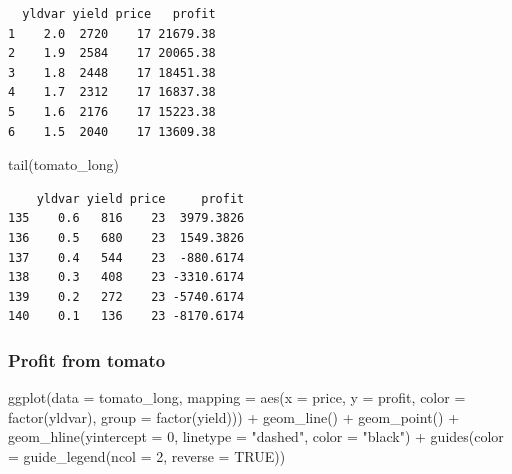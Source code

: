 \documentclass[
  letterpaper,
  DIV=11,
  numbers=noendperiod]{scrartcl}
\newenvironment{Shaded}{\begin{snugshade}}{\end{snugshade}}
\newcommand{\AttributeTok}[1]{\textcolor[rgb]{0.40,0.45,0.13}{#1}}
\newcommand{\ConstantTok}[1]{\textcolor[rgb]{0.56,0.35,0.01}{#1}}
\newcommand{\DecValTok}[1]{\textcolor[rgb]{0.68,0.00,0.00}{#1}}
\newcommand{\FunctionTok}[1]{\textcolor[rgb]{0.28,0.35,0.67}{#1}}
\newcommand{\NormalTok}[1]{\textcolor[rgb]{0.00,0.23,0.31}{#1}}
\newcommand{\SpecialCharTok}[1]{\textcolor[rgb]{0.37,0.37,0.37}{#1}}
\newcommand{\StringTok}[1]{\textcolor[rgb]{0.13,0.47,0.30}{#1}}
\begin{document}
\begin{verbatim}
  yldvar yield price   profit
1    2.0  2720    17 21679.38
2    1.9  2584    17 20065.38
3    1.8  2448    17 18451.38
4    1.7  2312    17 16837.38
5    1.6  2176    17 15223.38
6    1.5  2040    17 13609.38
\end{verbatim}

\begin{Shaded}
\begin{Highlighting}[]
\FunctionTok{tail}\NormalTok{(tomato\_long)}
\end{Highlighting}
\end{Shaded}

\begin{verbatim}
    yldvar yield price     profit
135    0.6   816    23  3979.3826
136    0.5   680    23  1549.3826
137    0.4   544    23  -880.6174
138    0.3   408    23 -3310.6174
139    0.2   272    23 -5740.6174
140    0.1   136    23 -8170.6174
\end{verbatim}

\subsubsection{Profit from tomato}\label{profit-from-tomato}

\begin{Shaded}
\begin{Highlighting}[]
\FunctionTok{ggplot}\NormalTok{(}\AttributeTok{data =}\NormalTok{ tomato\_long,}
       \AttributeTok{mapping =} \FunctionTok{aes}\NormalTok{(}\AttributeTok{x =}\NormalTok{ price,}
                     \AttributeTok{y =}\NormalTok{ profit,}
                     \AttributeTok{color =} \FunctionTok{factor}\NormalTok{(yldvar),}
                     \AttributeTok{group =} \FunctionTok{factor}\NormalTok{(yield))) }\SpecialCharTok{+}
  \FunctionTok{geom\_line}\NormalTok{() }\SpecialCharTok{+}
  \FunctionTok{geom\_point}\NormalTok{() }\SpecialCharTok{+}
  \FunctionTok{geom\_hline}\NormalTok{(}\AttributeTok{yintercept =} \DecValTok{0}\NormalTok{,}
             \AttributeTok{linetype =} \StringTok{"dashed"}\NormalTok{,}
             \AttributeTok{color =} \StringTok{"black"}\NormalTok{) }\SpecialCharTok{+}
  \FunctionTok{guides}\NormalTok{(}\AttributeTok{color =} \FunctionTok{guide\_legend}\NormalTok{(}\AttributeTok{ncol =} \DecValTok{2}\NormalTok{,}
                              \AttributeTok{reverse =} \ConstantTok{TRUE}\NormalTok{))}
\end{Highlighting}
\end{Shaded}
\end{document}
